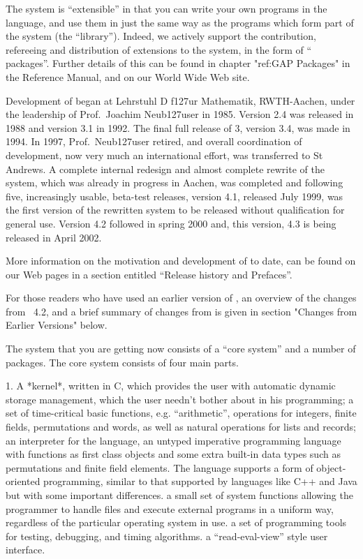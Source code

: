 The system is ``extensible'' in that you can write your own  programs  in
the {\GAP} language, and use them in just the same way  as  the  programs
which form part of the system  (the  ``library'').  Indeed,  we  actively
support the contribution, refereeing and distribution  of  extensions  to
the system, in the form of ``{\GAP} packages''.  Further details of  this
can be found in chapter "ref:GAP Packages" in the Reference Manual, and
on our World Wide Web site.

Development of {\GAP} began at Lehrstuhl D f\accent127ur Mathematik,
RWTH-Aachen, under the leadership of Prof.~Joachim Neub\accent127user
in 1985. Version 2.4 was released in 1988 and version 3.1 in 1992.
The final full release of {\GAP} 3, version 3.4, was made in 1994. In
1997, Prof.~Neub\accent127user retired, and overall coordination of
{\GAP} development, now very much an international effort, was
transferred to St Andrews.  A complete internal redesign and almost
complete rewrite of the system, which was already in progress in
Aachen, was completed and following five, increasingly usable,
beta-test releases, version 4.1, released July 1999, was the first
version of the rewritten system to be released without qualification
for general use. Version 4.2 followed in spring 2000 and, this
version, {\GAP} 4.3 is being released in April 2002.

More information on the motivation and development of {\GAP} to date,
can be found on our Web pages in a section entitled ``Release history
and Prefaces''.

For those readers who have used an earlier version of {\GAP}, an
overview of the changes from {\GAP}~4.2, and a brief summary of
changes from {} is given in section "Changes from Earlier
Versions" below.

The system that you are getting now consists of a ``core system'' and
a number of packages. The core system consists of four main parts.
\beginlist%
  \item{1.}
    A  *kernel*, written in C, which provides the user with
    \itemitem{--}%
      automatic dynamic storage management, which the user needn't bother
      about in his programming;
    \itemitem{--}
      a   set of  time-critical basic   functions, e.g.   ``arithmetic'',
      operations for integers, finite fields,  permutations and words, as
      well as natural operations for lists and records;
    \itemitem{--} 
      an interpreter   for  the {\GAP} language,    an untyped
      imperative programming language with functions as first class objects
      and some extra built-in data types such as permutations and finite
      field elements.  The language supports a form of object-oriented
      programming, similar to that supported by languages like C++ and
      Java but with some important differences.
    \itemitem{--}
      a small set of system functions allowing the {\GAP} programmer to handle
      files and execute external programs in a uniform way, regardless of 
      the particular operating system in use. 
    \itemitem{--}
      a  set  of programming tools  for   testing, debugging, and timing
      algorithms.
    \itemitem{--}
      a ``read-eval-view'' style user interface.

